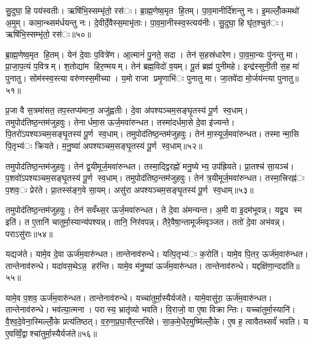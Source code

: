 सु॒दुघा॒ हि पय॑स्वतीः। ऋषि॑भि॒स्सम्भृ॑तो॒ रस॑ः। ब्रा॒ह्म॒णेष्व॒मृत हि॒तम्। पा॒व॒मानीर्दि॑शन्तु नः। इ॒मल्लोँ॒कमथो॑ अ॒मुम्। कामा॒न्थ्सम॑र्धयन्तु नः। दे॒वीर्दे॒वैस्स॒माभृ॑ताः। पा॒व॒मा॒नीस्स्व॒स्त्यय॑नीः। सु॒दुघा॒ हि घृ॑त॒श्चुत॑ः। ऋषि॑भि॒स्सम्भृ॑तो॒ रस॑ः॥५०॥

ब्रा॒ह्म॒णेष्व॒मृत हि॒तम्। येन॑ दे॒वाः प॒वित्रे॑ण। आ॒त्मानं॑ पु॒नते॒ सदा। तेन॑ स॒हस्र॑धारेण। पा॒व॒मा॒न्यः पु॑नन्तु मा। प्रा॒जा॒प॒त्यं प॒वित्रम्। श॒तोद्या॑म हिर॒ण्मयम्। तेन॑ ब्रह्म॒विदो॑ व॒यम्। पू॒तं ब्रह्म॑ पुनीमहे। इन्द्र॑स्सुनी॒ती स॒ह मा॑ पुनातु। सोम॑स्स्व॒स्त्या वरु॑णस्स॒मीच्या। य॒मो राजा प्रमृ॒णाभि॑ः पुनातु मा। जा॒तवे॑दा मो॒र्जय॑न्त्या पुनातु॥५१॥


प्र॒जा वै स॒त्रमा॑सत॒ तप॒स्तप्य॑माना॒ अजु॑ह्वतीः। दे॒वा अ॑पश्यञ्चम॒सङ्घृ॒तस्य॑ पू॒र्ण स्व॒धाम्। तमुपोद॑तिष्ठ॒न्तम॑जुहवुः। तेनार्धमा॒स ऊर्ज॒मवा॑रुन्धत। तस्मा॑दर्धमा॒से दे॒वा इ॑ज्यन्ते। पि॒तरो॑ऽपश्यञ्चम॒सङ्घृ॒तस्य॑ पू॒र्ण स्व॒धाम्। तमुपोद॑तिष्ठ॒न्तम॑जुहवुः। तेन॑ मा॒स्यूर्ज॒मवा॑रुन्धत। तस्मान्मा॒सि पि॒तृभ्य॑ः क्रियते। म॒नु॒ष्या॑ अपश्यञ्चम॒सङ्घृ॒तस्य॑ पू॒र्ण स्व॒धाम्॥५२॥

तमुपोद॑तिष्ठ॒न्तम॑जुहवुः। तेन॑ द्व॒यीमूर्ज॒मवा॑रुन्धत। तस्मा॒द्द्विरह्नो॑ मनु॒ष्येभ्य॒ उप॑ह्रियते। प्रा॒तश्च॑ सा॒यञ्च॑। प॒शवो॑ऽपश्यञ्चम॒सङ्घृ॒तस्य॑ पू॒र्ण स्व॒धाम्। तमुपोद॑तिष्ठ॒न्तम॑जुहवुः। तेन॑ त्र॒यीमूर्ज॒मवा॑रुन्धत। तस्मा॒त्त्रिरह्न॑ः प॒शव॒ः प्रेर॑ते। प्रा॒तस्स॑ङ्ग॒वे सा॒यम्। असु॑रा अपश्यञ्चम॒सङ्घृ॒तस्य॑ पू॒र्ण स्व॒धाम्॥५३॥

तमुपोद॑तिष्ठ॒न्तम॑जुहवुः। तेन॑ सवँथ्स॒र ऊर्ज॒मवा॑रुन्धत। ते दे॒वा अ॑मन्यन्त। अ॒मी वा इ॒दम॑भूवन्न्। यद्व॒य स्म इति॑। त ए॒तानि॑ चातुर्मा॒स्यान्य॑पश्यन्न्। तानि॒ निर॑वपन्न्। तैरे॒वैषा॒न्तामूर्ज॑मवृञ्जत। ततो॑ दे॒वा अभ॑वन्न्। पराऽसु॑राः॥५४॥

यद्यज॑ते। यामे॒व दे॒वा ऊर्ज॑म॒वारु॑न्धत। तान्तेनाव॑रुन्धे। यत्पि॒तृभ्य॑ः क॒रोति॑। यामे॒व पि॒तर॒ ऊर्ज॑म॒वारु॑न्धत। तान्तेनाव॑रुन्धे। यदा॑वस॒थेऽन्न॒ हर॑न्ति। यामे॒व म॑नु॒ष्या॑ ऊर्ज॑म॒वारु॑न्धत। तान्तेनाव॑रुन्धे। यद्दक्षि॑णा॒न्ददा॑ति॥५५॥

यामे॒व प॒शव॒ ऊर्ज॑म॒वारु॑न्धत। तान्तेनाव॑रुन्धे। यच्चा॑तुर्मा॒स्यैर्यज॑ते। यामे॒वासु॑रा॒ ऊर्ज॑म॒वारु॑न्धत। तान्तेनाव॑रुन्धे। भव॑त्या॒त्मना। परास्य॒ भ्रातृ॑व्यो भवति। वि॒राजो॒ वा ए॒षा विक्रान्तिः। यच्चा॑तुर्मा॒स्यानि॑। वै॒श्व॒दे॒वेना॒स्मिल्लोँ॒के प्रत्य॑तिष्ठत्। व॒रु॒ण॒प्र॒घा॒सैर॒न्तरि॑क्षे। सा॒क॒मे॒धैर॒मुष्मि॑ल्लोँ॒के। ए॒ष ह॒ त्वावैतथ्सर्वं॑ भवति। य ए॒वव्विँ॒द्वाश्चा॑तुर्मा॒स्यैर्यज॑ते॥५६॥

